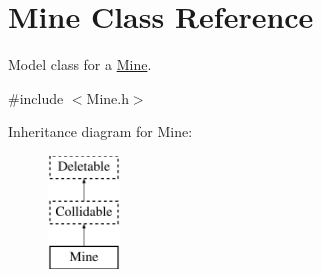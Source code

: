 \hypertarget{classMine}{\section{Mine Class Reference}
\label{classMine}
}


Model class for a \hyperlink{classMine}{Mine}.  




{\ttfamily \#include $<$Mine.\-h$>$}

Inheritance diagram for Mine\-:\begin{figure}[H]
\begin{center}
\leavevmode
\includegraphics[height=3.000000cm]{classMine}
\end{center}
\end{figure}
